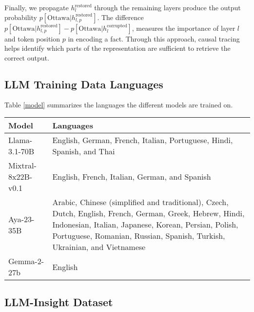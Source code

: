 Finally, we propagate $h^{\text{restored}}_l$ through the remaining layers produce the output probability $p[\text{Ottawa}|h^{{\text{restored}}}_{l,p}]$.
The difference $p[\text{Ottawa}|h^{{\text{restored}}}_{l,p}] - p[\text{Ottawa}|h_l^{\text{corrupted}}]$, measures the importance of layer $l$ and token position $p$ in encoding a fact. 
Through this approach, causal tracing helps identify which parts of the representation are sufficient to retrieve the correct output. 


\subsection{LLM Training Data Languages}

Table \ref{model} summarizes the languages the different models are trained on. 

\begin{table*}[h]
\caption{LLMs: High resource training languages}
\label{model}
\vskip 0.15in
\begin{center}
\begin{small}
\begin{sc}
\begin{tabular}{p{6cm} p{8cm}} 
\toprule
{\bf Model} & {\bf Languages} \\ \midrule 
Llama-3.1-70B \citep{dubey2024llama3herdmodels} & English, German, French, Italian, Portuguese, Hindi, Spanish, and Thai \\  
Mixtral-8x22B-v0.1 \citep{jiang2024mixtralexperts} & English, French, Italian, German, and Spanish \\  
Aya-23-35B \citep{aryabumi2024aya} & Arabic, Chinese (simplified and traditional), Czech, Dutch, English, French, German, Greek, Hebrew, Hindi, Indonesian, Italian, Japanese, Korean, Persian, Polish, Portuguese, Romanian, Russian, Spanish, Turkish, Ukrainian, and Vietnamese \\  
Gemma-2-27b  \citep{gemma_2024} & English \\ 
\bottomrule
\end{tabular}
\end{sc}
\end{small}
\end{center}
\vskip -0.1in
\end{table*}


\subsection{LLM-Insight Dataset} \label{sec:appendix_dataset}

